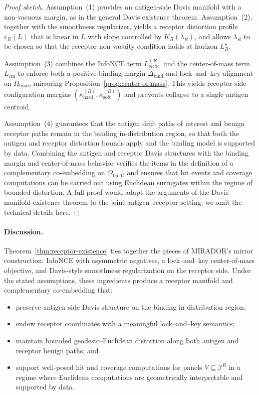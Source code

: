 \documentclass[11pt]{article}
\newcommand{\Ical}{\mathcal{I}}
\begin{document}
\begin{proof}[Proof sketch]
Assumption~(1) provides an antigen-side Davis manifold with a non-vacuous
margin, as in the general Davis existence theorem. Assumption~(2), together
with the smoothness regularizer, yields a receptor distortion profile
$\varepsilon_R(L)$ that is linear in $L$ with slope controlled by
$K_R(\lambda_R)$, and allows $\lambda_R$ to be chosen so that the receptor
non-vacuity condition holds at horizon $L_R^\star$.

Assumption~(3) combines the InfoNCE term $L_{\mathrm{NCE}}^{(R)}$ and the
center-of-mass term $L_{\mathrm{cm}}$ to enforce both a positive binding margin
$\Delta_{\mathrm{bind}}$ and lock–and–key alignment on $\Omega_{\mathrm{bind}}$,
mirroring Proposition~\ref{prop:center-of-mass}. This yields receptor-side
configuration margins $(\kappa_{\mathrm{hard}}^{(R)},\kappa_{\mathrm{soft}}^{(R)})$
and prevents collapse to a single antigen centroid.

Assumption~(4) guarantees that the antigen drift paths of interest and benign
receptor paths remain in the binding in-distribution region, so that both the
antigen and receptor distortion bounds apply and the binding model is
supported by data. Combining the antigen and receptor Davis structures with
the binding margin and center-of-mass behavior verifies the items in the
definition of a complementary co-embedding on $\Omega_{\mathrm{bind}}$, and
ensures that hit events and coverage computations can be carried out using
Euclidean surrogates within the regime of bounded distortion. A full proof
would adapt the arguments of the Davis manifold existence theorem to the joint
antigen–receptor setting; we omit the technical details here.
\end{proof}

\paragraph{Discussion.}
Theorem~\ref{thm:receptor-existence} ties together the pieces of MIRADOR's
mirror construction: InfoNCE with asymmetric negatives, a lock–and–key
center-of-mass objective, and Davis-style smoothness regularization on the
receptor side. Under the stated assumptions, these ingredients produce a
receptor manifold and complementary co-embedding that:

\begin{itemize}
  \item preserve antigen-side Davis structure on the binding in-distribution
    region;
  \item endow receptor coordinates with a meaningful lock–and–key semantics;
  \item maintain bounded geodesic–Euclidean distortion along both antigen and
    receptor benign paths; and
  \item support well-posed hit and coverage computations for panels
    $V \subseteq \Ical^R$ in a regime where Euclidean computations are
    geometrically interpretable and supported by data.
\end{itemize}
\end{document}
